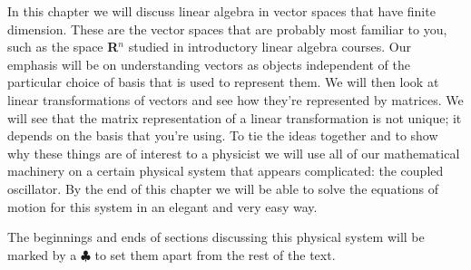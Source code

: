 In this chapter we will discuss linear algebra in vector spaces that have finite dimension.
These are the vector spaces that are probably most familiar to you, such as the space \textbf{R}$^{n}$ studied in introductory linear algebra courses.
Our emphasis will be on understanding vectors as objects independent of the particular choice of basis that is used to represent them.
We will then look at linear transformations of vectors and see how they're represented by matrices.
We will see that the matrix representation of a linear transformation is not unique; it depends on the basis that you're using.
To tie the ideas together and to show why these things are of interest to a physicist we will use all of our mathematical machinery on a certain physical system that appears complicated: the coupled oscillator.
By the end of this chapter we will be able to solve the equations of motion for this system in an elegant and very easy way.

The beginnings and ends of sections discussing this physical system will be marked by a $\clubsuit$ to set them apart from the rest of the text.


